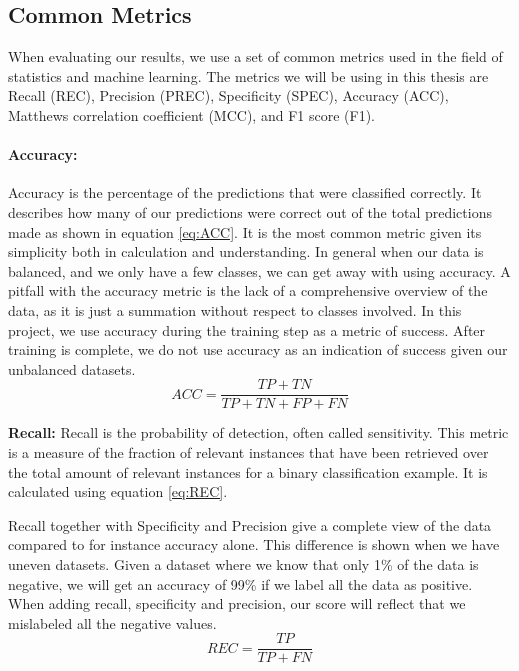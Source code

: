 \subsection{Common Metrics}
\label{cha:metrics}
When evaluating our results, we use a set of common metrics used in the field of statistics and machine learning.  The metrics we will be using in this thesis are Recall (REC), Precision (PREC), Specificity (SPEC), Accuracy (ACC), Matthews correlation coefficient (MCC), and F1 score (F1). 


\vspace{5px}
\paragraph{Accuracy:}  
Accuracy is the percentage of the predictions that were classified correctly.
It describes how many of our predictions were correct out of the total predictions made as shown in equation \ref{eq:ACC}. It is the most common metric given its simplicity both in calculation and understanding. 
In general when our data is balanced, and we only have a few classes, we can get away with using accuracy.
A pitfall with the accuracy metric is the lack of a comprehensive overview of the data, as it is just a summation without respect to classes involved.
In this project, we use accuracy during the training step as a metric of success. After training is complete, we do not use accuracy as an indication of success given our unbalanced datasets. 
 \begin{equation}
ACC=\frac{TP+TN}{TP+TN+FP+FN}
\label{eq:ACC}
\end{equation}

\vspace{5px}
\textbf{Recall:}  
Recall is the probability of detection, often called sensitivity.
This metric is a measure of the fraction of relevant instances that have been retrieved over the total amount of relevant instances for a binary classification example. It is calculated using equation \ref{eq:REC}.

Recall together with Specificity and Precision give a complete view of the data compared to for instance accuracy alone. This difference is shown when we have uneven datasets. Given a dataset where we know that only 1\% of the data is negative, we will get an accuracy of 99\% if we label all the data as positive. When adding recall, specificity and precision, our score will reflect that we mislabeled all the negative values.
\begin{equation}
REC=\frac{TP}{TP+FN}
\label{eq:REC}
\end{equation}




